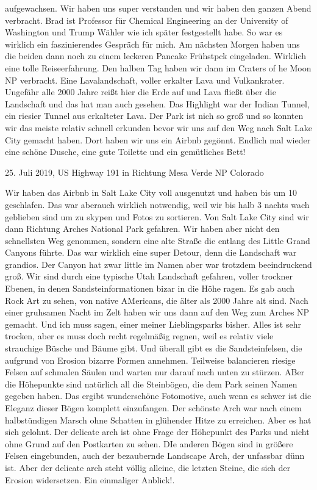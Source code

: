 \documentclass[11pt]{book}
\begin{document}
aufgewachsen. Wir haben uns super verstanden und wir haben den ganzen Abend verbracht. Brad ist Professor für Chemical Engineering an der University of 
Washington und Trump Wähler wie ich später festgestellt habe. So war es wirklich ein faszinierendes Gespräch für mich. Am nächsten Morgen haben uns die beiden 
dann noch zu einem leckeren Pancake Frühstpck eingeladen. Wirklich eine tolle Reiseerfahrung. 
Den halben Tag haben wir dann im Craters of he Moon NP verbracht. Eine Lavalandschaft, voller erkalter Lava und Vulkankrater. Ungefähr alle 2000 Jahre reißt hier die 
Erde auf und Lava fließt über die Landschaft und das hat man auch gesehen. Das Highlight war der Indian Tunnel, ein riesier Tunnel aus erkalteter Lava. Der Park 
ist nich so groß und so konnten wir das meiste relativ schnell erkunden bevor wir uns auf den Weg nach Salt Lake City gemacht haben. Dort haben wir uns 
ein Airbnb gegönnt. Endlich mal wieder eine schöne Dusche, eine gute Toilette und ein gemütliches Bett!


25. Juli 2019, US Highway 191 in Richtung Mesa Verde NP Colorado

Wir haben das Airbnb in Salt Lake City voll ausgenutzt und haben bis um 10 geschlafen. Das war aberauch wirklich notwendig, weil wir bis halb 3 nachts wach geblieben 
sind um zu skypen und Fotos zu sortieren. Von Salt Lake City sind wir dann Richtung Arches National Park gefahren. Wir haben aber nicht den schnellsten Weg genommen, 
sondern eine alte Straße die entlang des Little Grand Canyons führte. Das war wirklich eine super Detour, denn die Landschaft war grandios. Der Canyon hat zwar little im 
Namen aber war trotzdem beeindruckend groß. Wir sind durch eine typische Utah Landschaft gefahren, voller trockner Ebenen, in denen Sandsteinformationen 
bizar in die Höhe ragen. Es gab auch Rock Art zu sehen, von native AMericans, die älter als 2000 Jahre alt sind. 
Nach einer gruhsamen Nacht im Zelt haben wir uns dann auf den Weg zum Arches NP gemacht. Und ich muss sagen, einer meiner Lieblingsparks bisher. Alles 
ist sehr trocken, aber es muss doch recht regelmäßig regnen, weil es relativ viele strauchige Büsche und Bäume gibt. Und überall gibt es die Sandsteinfelsen, 
die aufgrund von Erosion bizarre Formen annehmen. Teilweise balancieren riesige Felsen auf schmalen Säulen und warten nur darauf nach unten zu stürzen. 
ABer die Höhepunkte sind natürlich all die Steinbögen, die dem Park seinen Namen gegeben haben. Das ergibt wunderschöne Fotomotive, auch wenn es schwer ist 
die Eleganz dieser Bögen komplett einzufangen. Der schönste Arch war nach einem halbstündigen Marsch ohne Schatten in glühender Hitze zu erreichen. Aber es 
hat sich gelohnt. Der delicate arch ist ohne Frage der Höhepunkt des Parks und nicht ohne Grund auf den Postkarten zu sehen. DIe anderen Bögen sind in größere 
Felsen eingebunden, auch der bezaubernde Landscape Arch, der unfassbar dünn ist. Aber der delicate arch steht völlig alleine, die letzten Steine, die sich der 
Erosion widersetzen. Ein einmaliger Anblick!.
\end{document}
